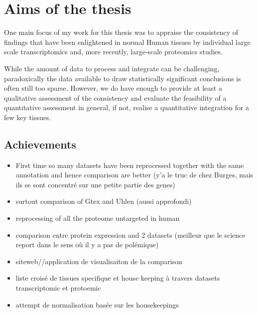 \section*{Aims of the thesis}

One main focus of my work for this thesis was to appraise the
consistency of findings that have been enlightened in normal Human tissues by
individual large scale transcriptomics and, more recently, large-scale
proteomics studies.

While the amount of data to process and integrate can be challenging,
paradoxically the data available to draw statistically significant conclusions
is often still too sparse. However, we do have enough to provide at least a
qualitative assessment of the consistency and evaluate the feasibility of a
quantitative assessment in general, if not, realise a quantitative integration
for a few key tissues.

\subsection*{Achievements}
\begin{itemize}
    \item First time so many datasets have been reprocessed together with the
        same annotation and hence comparison are better (y'a le truc de chez Burges,
        mais ils se sont concentré sur une petite partie des genes)
    \item surtout comparison of Gtex and Uhlen (aussi approfondi)
    \item reprocessing of all the proteome untargeted in human
    \item comparison entre protein expression and 2 datasets (meilleur que le
        science report dans le sens où il y a pas de polémique)
    \item siteweb//application de visualisaiton de la comparison
    \item liste croisé de tissues specifique et house keeping à travers datasets
       transcriptomic et protoemic
  \item attempt de normalisation basée sur les housekeepings
\end{itemize}


